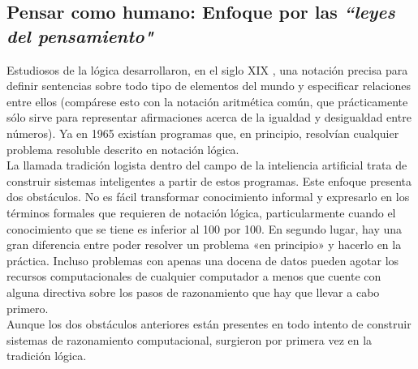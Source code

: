 \documentclass[12pt,a4paper]{report}
\begin{document}
\subsection*{Pensar como humano: Enfoque por las \textit{ ``leyes del pensamiento"}}
Estudiosos de la lógica desarrollaron, en el siglo XIX , una notación precisa para definir sentencias sobre todo tipo de elementos del mundo y especificar relaciones entre ellos (compárese esto con la notación aritmética común, que prácticamente sólo sirve
para representar afirmaciones acerca de la igualdad y desigualdad entre números). Ya
en 1965 existían programas que, en principio, resolvían cualquier problema resoluble
descrito en notación lógica.\\ La llamada tradición logista dentro del campo de la inteliencia artificial trata de construir sistemas inteligentes a partir de estos programas. Este enfoque presenta dos obstáculos. No es fácil transformar conocimiento informal y expresarlo en los términos formales que requieren de notación lógica, particularmente cuando el conocimiento que se tiene es inferior al 100 por 100. En segundo lugar, hay una gran diferencia entre poder resolver un problema «en principio» y hacerlo en la práctica. Incluso problemas con apenas una docena de datos pueden agotar los recursos computacionales de cualquier computador a menos que cuente con alguna directiva sobre los pasos de razonamiento que hay que llevar a cabo primero.\\ Aunque los dos obstáculos anteriores están presentes en todo intento de construir sistemas de razonamiento computacional, surgieron por primera vez en la tradición lógica.
\end{document}
